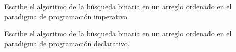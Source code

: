     \begin{exercise}
        Escribe el algoritmo de la búsqueda binaria en un arreglo ordenado en el paradigma de programación imperativo.
    \end{exercise}

    \begin{exercise}
        Escribe el algoritmo de la búsqueda binaria en un arreglo ordenado en el paradigma de programación declarativo.
    \end{exercise}



